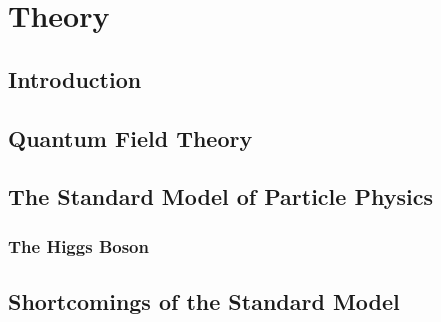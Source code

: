 \chapter{Theory}

\section{Introduction} \label{sec:theory_intro}


\section{Quantum Field Theory} \label{sec:theory_qft}


\section{The Standard Model of Particle Physics} \label{sec:theory_sm}


\subsection{The Higgs Boson} \label{sec:theory_higgs}


\section{Shortcomings of the Standard Model} \label{sec:theory_sm_problems}


